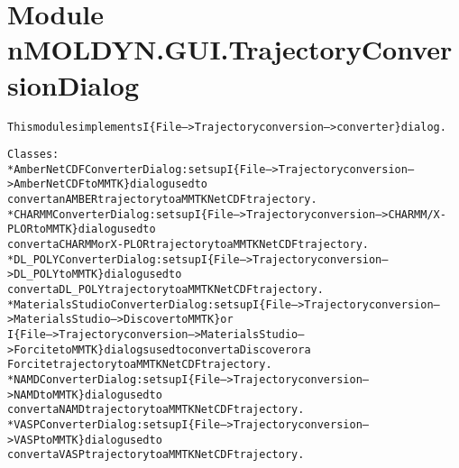 %
%
%


\section{Module nMOLDYN.GUI.TrajectoryConversionDialog}

    \label{nMOLDYN:GUI:TrajectoryConversionDialog}
\begin{alltt}
This modules implements I\{File --{\textgreater} Trajectory conversion --{\textgreater} converter\} dialog.

Classes:
    * AmberNetCDFConverterDialog: sets up I\{File--{\textgreater}Trajectory conversion --{\textgreater} Amber NetCDF to MMTK\} dialog used to 
      convert an AMBER trajectory to a MMTK NetCDF trajectory.
    * CHARMMConverterDialog: sets up I\{File--{\textgreater}Trajectory conversion --{\textgreater} CHARMM/X-PLOR to MMTK\} dialog used to 
      convert a CHARMM or X-PLOR trajectory to a MMTK NetCDF trajectory.
    * DL\_POLYConverterDialog: sets up I\{File--{\textgreater}Trajectory conversion --{\textgreater} DL\_POLY to MMTK\} dialog used to 
      convert a DL\_POLY trajectory to a MMTK NetCDF trajectory.      
    * MaterialsStudioConverterDialog: sets up I\{File--{\textgreater}Trajectory conversion --{\textgreater} MaterialsStudio --{\textgreater} Discover to MMTK\} or 
      I\{File--{\textgreater}Trajectory conversion --{\textgreater} MaterialsStudio --{\textgreater} Forcite to MMTK\} dialogs used to convert a Discover or a 
      Forcite trajectory to a MMTK NetCDF trajectory.
    * NAMDConverterDialog: sets up I\{File--{\textgreater}Trajectory conversion --{\textgreater} NAMD to MMTK\} dialog used to 
      convert a NAMD trajectory to a MMTK NetCDF trajectory.
    * VASPConverterDialog: sets up I\{File--{\textgreater}Trajectory conversion --{\textgreater} VASP to MMTK\} dialog used to 
      convert a VASP trajectory to a MMTK NetCDF trajectory.
\end{alltt}



